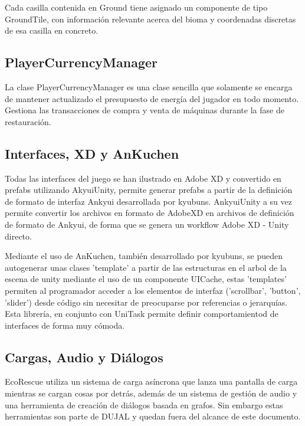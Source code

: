 Cada casilla contenida en Ground tiene asignado un componente de tipo GroundTile, con información relevante acerca del bioma y coordenadas discretas de esa casilla en concreto. 

\subsection{PlayerCurrencyManager}

La clase PlayerCurrencyManager es una clase sencilla que solamente se encarga de mantener actualizado el presupuesto de energía del jugador en todo momento. Gestiona las transacciones de compra y venta de máquinas durante la fase de restauración.

\subsection{Interfaces, XD y AnKuchen}

Todas las interfaces del juego se han ilustrado en Adobe XD y convertido en prefabs utilizando AkyuiUnity\cite{AkyuiUnity}, permite generar prefabs a partir de la definición de formato de interfaz Ankyui desarrollada por kyubuns. AnkyuiUnity a su vez permite convertir los archivos en formato de AdobeXD en archivos de definición de formato de Ankyui, de forma que se genera un workflow Adobe XD - Unity directo.

Mediante el uso de AnKuchen\cite{AnKuchen}, también desarrollado por kyubuns, se pueden autogenerar unas clases 'template' a partir de las estructuras en el arbol de la escena de unity mediante el uso de un componente UICache, estas 'templates' permiten al programador acceder a los elementos de interfaz ('scrollbar', 'button', 'slider') desde código sin necesitar de preocuparse por referencias o jerarquías. Esta librería, en conjunto con UniTask\cite{UniTask} permite definir comportamientod de interfaces de forma muy cómoda.

\subsection{Cargas, Audio y Diálogos}

EcoRescue utiliza un sistema de carga asíncrona que lanza una pantalla de carga mientras se cargan cosas por detrás, además de un sistema de gestión de audio y una herramienta de creación de diálogos basada en grafos. Sin embargo estas herramientas son parte de DUJAL\cite{DUJAL} y quedan fuera del alcance de este documento. 

